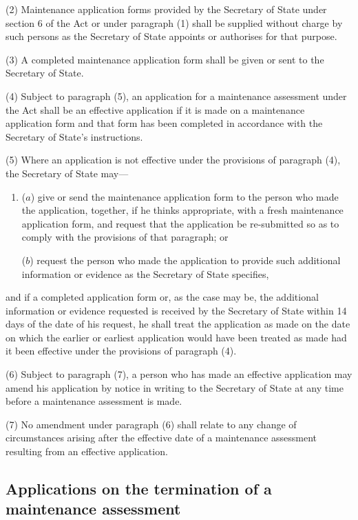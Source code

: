 \documentclass[a4paper,12pt]{article}
\begin{document}
(2) Maintenance application forms provided by the Secretary of State under section 6 of the Act or under paragraph (1) shall be supplied without charge by such persons as the Secretary of State appoints or authorises for that purpose.

(3) A completed maintenance application form shall be given or sent to the Secretary of State.

(4) Subject to paragraph (5), an application for a maintenance assessment under the Act shall be an effective application if it is made on a maintenance application form and that form has been completed in accordance with the Secretary of State’s instructions.

(5) Where an application is not effective under the provisions of paragraph (4), the Secretary of State may—
\begin{enumerate}\item[]
($a$) give or send the maintenance application form to the person who made the application, together, if he thinks appropriate, with a fresh maintenance application form, and request that the application be re-submitted so as to comply with the provisions of that paragraph; or

($b$) request the person who made the application to provide such additional information or evidence as the Secretary of State specifies,
\end{enumerate}
and if a completed application form or, as the case may be, the additional information or evidence requested is received by the Secretary of State within 14 days of the date of his request, he shall treat the application as made on the date on which the earlier or earliest application would have been treated as made had it been effective under the provisions of paragraph (4).

(6) Subject to paragraph (7), a person who has made an effective application may amend his application by notice in writing to the Secretary of State at any time before a maintenance assessment is made.

(7) No amendment under paragraph (6) shall relate to any change of circumstances arising after the effective date of a maintenance assessment resulting from an effective application.

\subsection[3. Applications on the termination of a maintenance assessment]{Applications on the termination of a maintenance assessment}
\end{document}
